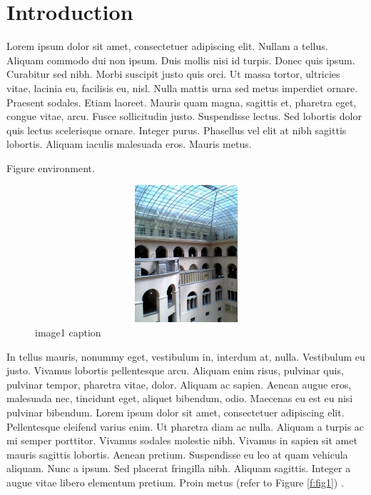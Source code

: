 \chapter{Introduction}
\label{k:einleitung} Lorem ipsum dolor sit amet, consectetuer adipiscing elit.
Nullam a tellus. Aliquam commodo dui non ipsum. Duis mollis nisi id turpis.
Donec quis ipsum. Curabitur sed nibh. Morbi suscipit justo quis orci. Ut massa
tortor, ultricies vitae, lacinia eu, facilisis eu, nisl. Nulla mattis urna sed
metus imperdiet ornare. Praesent sodales. Etiam laoreet. Mauris quam magna,
sagittis et, pharetra eget, congue vitae, arcu. Fusce sollicitudin justo.
Suspendisse lectus. Sed lobortis dolor quis lectus scelerisque ornare. Integer
purus. Phasellus vel elit at nibh sagittis lobortis. Aliquam iaculis malesuada
eros. Mauris metus.

Figure environment.

\begin{figure}
\centering
\includegraphics[height=2.0in,width=5.0in]{./section-introduction/figures/uzhlichthof.jpg}
\caption{image1 caption}
\label{f:figtag}
\end{figure}



In tellus mauris, nonummy eget, vestibulum in, interdum at, nulla. Vestibulum
eu justo. Vivamus lobortis pellentesque arcu. Aliquam enim risus, pulvinar
quis, pulvinar tempor, pharetra vitae, dolor. Aliquam ac sapien. Aenean augue
eros, malesuada nec, tincidunt eget, aliquet bibendum, odio. Maecenas eu est eu
nisi pulvinar bibendum. Lorem ipsum dolor sit amet, consectetuer adipiscing
elit. Pellentesque eleifend varius enim. Ut pharetra diam ac nulla. Aliquam a
turpis ac mi semper porttitor. Vivamus sodales molestie nibh. Vivamus in sapien
sit amet mauris sagittis lobortis. Aenean pretium. Suspendisse eu leo at quam
vehicula aliquam. Nunc a ipsum. Sed placerat fringilla nibh. Aliquam sagittis.
Integer a augue vitae libero elementum pretium. Proin metus (refer to Figure
\ref{f:fig1}) \cite{salton83introduction}.

